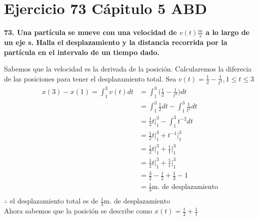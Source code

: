 \chapter*{Ejercicio 73 Cápitulo 5 ABD}
\textbf{73. Una partícula se mueve con una velocidad de $v(t)\frac{m}{s}$ a lo largo de un eje s. Halla el desplazamiento y la distancia recorrida por la partícula en el intervalo de un tiempo dado.}

Sabemos que la velocidad es la derivada de la posición.
Calcularemos la diferecia de las posiciones para tener el desplazamiento total.
Sea $v(t)=\displaystyle\frac{1}{2}-\frac{1}{t^2},1\leq t \leq 3 $
\begin{align*}
	x(3)-x(1)=\int_{1}^{3}v(t)dt & =\int_{1}^{3}\big(\frac{1}{2}-\frac{1}{t^2}\big)dt      \\
	                             & =\int_{1}^{3}\frac{1}{2}dt -\int_{1}^{3}\frac{1}{t^2}dt \\
	                             & =\frac{1}{2}t\bigg|_1^3-\int_{1}^{3}t^{-2}dt            \\
	                             & =\frac{1}{2}t\bigg|_1^3+t^{-1}\bigg|_{1}^{3}            \\
	                             & =\frac{1}{2}t\bigg|_1^3+\frac{1}{t}\bigg|_{1}^{3}       \\
	                             & =\frac{1}{2}t\bigg|_1^3+\frac{1}{t}\bigg|_{1}^{3}       \\
	                             & =\frac{3}{2}-\frac{1}{2}+\frac{1}{3}-1                  \\
	                             & =\frac{1}{3}\text{m. de desplazamiento}                 \\
\end{align*}
$\therefore$ el desplazamiento total es de  $\frac{1}{3}\text{m. de desplazamiento}$\\
Ahora sabemos que la posición se describe como $x(t)=\frac{t}{2}+\frac{1}{t}$

